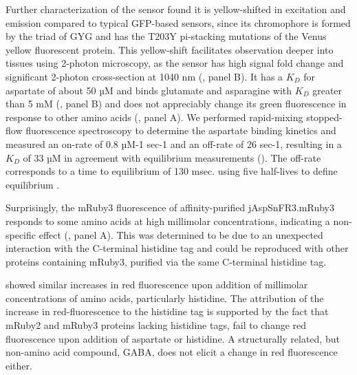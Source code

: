 \documentclass[9pt,lineno]{elife}
\begin{document}
Further characterization of the sensor found it is yellow-shifted in excitation and emission compared to typical GFP-based sensors, since its chromophore is formed by the triad of GYG and has the T203Y pi-stacking mutations of the Venus yellow fluorescent protein.
This yellow-shift facilitates observation deeper into tissues using 2-photon microscopy, as the sensor has high signal fold change and significant 2-photon cross-section at 1040 nm (, panel B).
It has a $K_D$ for aspartate of about 50 µM and binds glutamate and asparagine with $K_D$ greater than 5 mM (, panel B) and does not appreciably change its green fluorescence in response to other amino acids (, panel A).
We performed rapid-mixing stopped-flow fluorescence spectroscopy to determine the aspartate binding kinetics and measured an on-rate of 0.8 µM-1 sec-1 and an off-rate of 26 sec-1, resulting in a $K_D$ of 33 µM in agreement with equilibrium measurements ().
The off-rate corresponds to a time to equilibrium of 130 msec. using five half-lives to define equilibrium \cite{Jarmoskaite2020-pj}.

Surprisingly, the mRuby3 fluorescence of affinity-purified jAspSnFR3.mRuby3 responds to some amino acids at high millimolar concentrations, indicating a non-specific effect (, panel A).
This was determined to be due to an unexpected interaction with the C-terminal histidine tag and could be reproduced with other proteins containing mRuby3, purified via the same C-terminal histidine tag.



showed similar increases in red fluorescence upon addition of millimolar concentrations of amino acids, particularly histidine.
The attribution of the increase in red-fluorescence to the histidine tag is supported by the fact that mRuby2 and mRuby3 proteins lacking histidine tags, fail to change red fluorescence upon addition of aspartate or histidine.
A structurally related, but non-amino acid compound, GABA, does not elicit a change in red fluorescence either.


\end{document}
